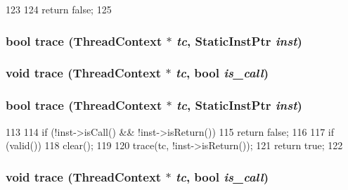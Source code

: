 \begin{DoxyCode}
123 {
124     return false;
125 }
\end{DoxyCode}
\hypertarget{classMipsISA_1_1StackTrace_aabb136846a5e22007e44db846652ddd5}{
\subsubsection[{trace}]{\setlength{\rightskip}{0pt plus 5cm}bool trace ({\bf ThreadContext} $\ast$ {\em tc}, \/  {\bf StaticInstPtr} {\em inst})}}
\label{classMipsISA_1_1StackTrace_aabb136846a5e22007e44db846652ddd5}
\hypertarget{classMipsISA_1_1StackTrace_a46d6b95a2e5fdb75702cf45e39566645}{
\subsubsection[{trace}]{\setlength{\rightskip}{0pt plus 5cm}void trace ({\bf ThreadContext} $\ast$ {\em tc}, \/  bool {\em is\_\-call})}}
\label{classMipsISA_1_1StackTrace_a46d6b95a2e5fdb75702cf45e39566645}
\hypertarget{classMipsISA_1_1StackTrace_aabb136846a5e22007e44db846652ddd5}{
\subsubsection[{trace}]{\setlength{\rightskip}{0pt plus 5cm}bool trace ({\bf ThreadContext} $\ast$ {\em tc}, \/  {\bf StaticInstPtr} {\em inst})}}
\label{classMipsISA_1_1StackTrace_aabb136846a5e22007e44db846652ddd5}



\begin{DoxyCode}
113 {
114     if (!inst->isCall() && !inst->isReturn())
115         return false;
116 
117     if (valid())
118         clear();
119 
120     trace(tc, !inst->isReturn());
121     return true;
122 }
\end{DoxyCode}
\hypertarget{classMipsISA_1_1StackTrace_a46d6b95a2e5fdb75702cf45e39566645}{
\subsubsection[{trace}]{\setlength{\rightskip}{0pt plus 5cm}void trace ({\bf ThreadContext} $\ast$ {\em tc}, \/  bool {\em is\_\-call})}}
\label{classMipsISA_1_1StackTrace_a46d6b95a2e5fdb75702cf45e39566645}




